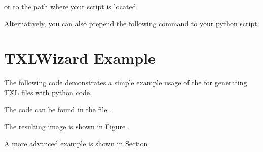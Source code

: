 \documentclass[letterpaper,10pt,english]{sphinxmanual}
\begin{document}
or to the path where your script is located.
\begin{description}
\item[{Alternatively, you can also prepend the following command to your python script:}] \leavevmode
{}

\end{description}


\chapter{TXLWizard Example}
\label{Chapters/20_Example:txlwizard-example}\label{Chapters/20_Example::doc}
\begin{DUlineblock}{0em}
\item[] The following code demonstrates a simple example usage of the  for
generating TXL files with python code.
\item[] The code can be found in the file .
\item[] The resulting image is shown in Figure .
\item[] A more advanced example is shown in Section 
\end{DUlineblock}
\end{document}

